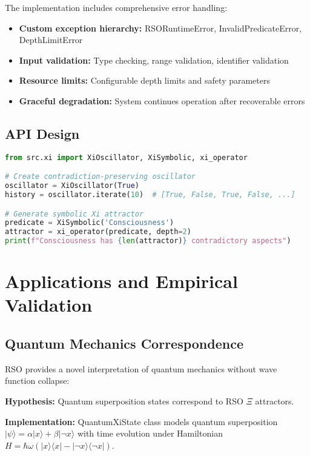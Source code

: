 \documentclass[11pt,a4paper]{article}
\begin{document}
The implementation includes comprehensive error handling:

\begin{itemize}
    \item \textbf{Custom exception hierarchy:} RSORuntimeError, InvalidPredicateError, DepthLimitError
    \item \textbf{Input validation:} Type checking, range validation, identifier validation
    \item \textbf{Resource limits:} Configurable depth limits and safety parameters
    \item \textbf{Graceful degradation:} System continues operation after recoverable errors
\end{itemize}

\subsection{API Design}

\begin{lstlisting}[language=Python, caption=RSO Framework API Example]
from src.xi import XiOscillator, XiSymbolic, xi_operator

# Create contradiction-preserving oscillator
oscillator = XiOscillator(True)
history = oscillator.iterate(10)  # [True, False, True, False, ...]

# Generate symbolic Xi attractor
predicate = XiSymbolic('Consciousness')
attractor = xi_operator(predicate, depth=2)
print(f"Consciousness has {len(attractor)} contradictory aspects")
\end{lstlisting}

\section{Applications and Empirical Validation}

\subsection{Quantum Mechanics Correspondence}

RSO provides a novel interpretation of quantum mechanics without wave function collapse:

\textbf{Hypothesis:} Quantum superposition states correspond to RSO $\Xi$ attractors.

\textbf{Implementation:} QuantumXiState class models quantum superposition $|\psi\rangle = \alpha|x\rangle + \beta|\neg x\rangle$ with time evolution under Hamiltonian $H = \hbar\omega(|x\rangle\langle x| - |\neg x\rangle\langle \neg x|)$.
\end{document}
